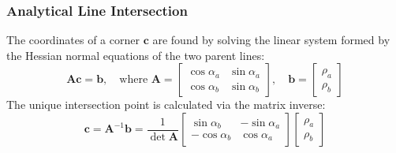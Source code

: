 \documentclass[11pt]{article}
\begin{document}
\subsubsection{Analytical Line Intersection}
The coordinates of a corner $\mathbf{c}$ are found by solving the linear system formed by the Hessian normal equations of the two parent lines:
\begin{equation}
	\mathbf{A}\mathbf{c} = \mathbf{b}, \quad \text{where } \mathbf{A} = \begin{bmatrix}\cos\alpha_a & \sin\alpha_a \\ \cos\alpha_b & \sin\alpha_b\end{bmatrix}, \quad \mathbf{b} = \begin{bmatrix}\rho_a \\ \rho_b\end{bmatrix}
\end{equation}
The unique intersection point is calculated via the matrix inverse:
\begin{equation}
	\mathbf{c} = \mathbf{A}^{-1}\mathbf{b} = \frac{1}{\det\mathbf{A}}\begin{bmatrix}\sin\alpha_b & -\sin\alpha_a \\ -\cos\alpha_b & \cos\alpha_a\end{bmatrix}\begin{bmatrix}\rho_a \\ \rho_b\end{bmatrix}
\end{equation}
\end{document}
